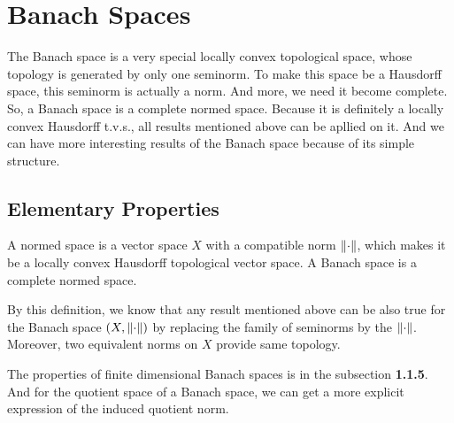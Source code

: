 \documentclass[a4paper,11pt]{report}
\begin{document}
\section{Banach Spaces}
The Banach space is a very special locally convex topological space, whose topology is generated by only one seminorm. To make this space be a Hausdorff space, this seminorm is actually a norm. And more, we need it become complete. So, a Banach space is a complete normed space. Because it is definitely a locally convex Hausdorff t.v.s., all results mentioned above can be apllied on it. And we can have more interesting results of the Banach space because of its simple structure.

\subsection{Elementary Properties}

\begin{defn}
	A normed space is a vector space $X$ with a compatible norm $\left\lVert\cdot\right\lVert$, which makes it be a locally convex Hausdorff topological vector space. A Banach space is a complete normed space.
\end{defn}
\begin{rem}
	By this definition, we know that any result mentioned above can be also true for the Banach space $(X,\left\lVert\cdot\right\lVert)$ by replacing the family of seminorms by the $\left\lVert\cdot\right\lVert$. Moreover, two equivalent norms on $X$ provide same topology.
\end{rem}

The properties of finite dimensional Banach spaces is in the subsection \textbf{1.1.5}. And for the quotient space of a Banach space, we can get a more explicit expression of the induced quotient norm.
\end{document}
